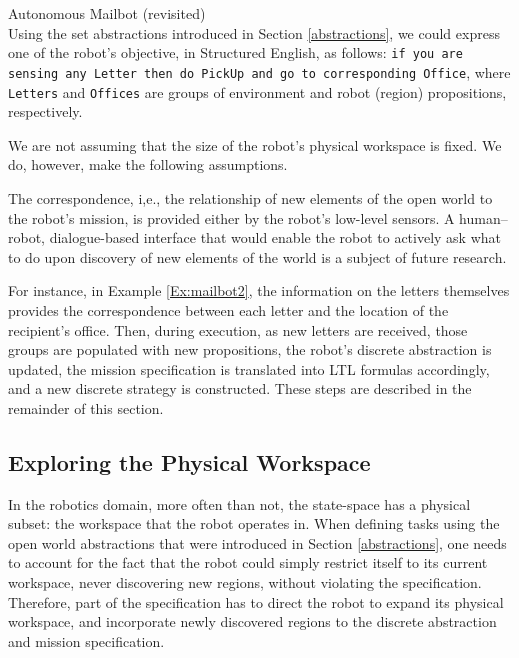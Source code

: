 \begin{myExample}\label{Ex:mailbot2} Autonomous Mailbot (revisited)\\
	Using the set abstractions introduced in Section \ref{abstractions}, we could express one of the robot's objective, in Structured English, as follows: 
\texttt{if you are sensing any Letter then do PickUp and go to corresponding Office}, where \texttt{Letters} and \texttt{Offices} are groups of environment and robot (region) propositions, respectively.
\end{myExample}

We are not assuming that the size of the robot's physical workspace is fixed. We do, however, make the following assumptions.

\begin{myAssumption}
	The correspondence, i,e., the relationship of new elements of the open world to the robot's mission, is provided either by the robot's low-level sensors. A human--robot, dialogue-based interface that would enable the robot to actively ask what to do upon discovery of new elements of the world is a subject of future research.
\end{myAssumption}

For instance, in Example \ref{Ex:mailbot2}, the information on the letters themselves provides the correspondence between each letter and the location of the recipient's office. Then, during execution, as new letters are received, those groups are populated with new propositions, the robot's discrete abstraction is updated, the mission specification is translated into LTL formulas accordingly, and a new discrete strategy is constructed. These steps are described in the remainder of this section.

\subsection{Exploring the Physical Workspace}

In the robotics domain, more often than not, the state-space has a physical subset: the workspace that the robot operates in. When defining tasks using the open world abstractions that were introduced in Section \ref{abstractions}, one needs to account for the fact that the robot could simply restrict itself to its current workspace, never discovering new regions, without violating the specification. Therefore, part of the specification has to direct the robot to expand its physical workspace, and incorporate newly discovered regions to the discrete abstraction and mission specification.

